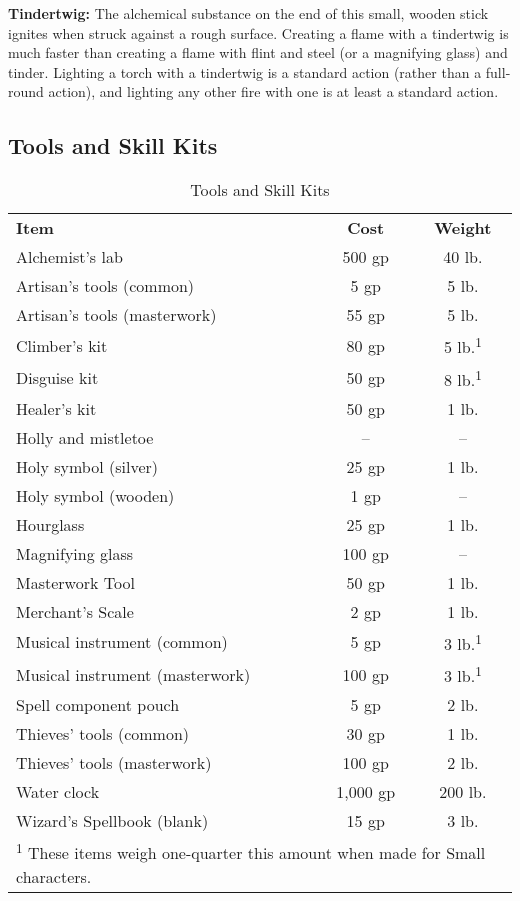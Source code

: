 \textbf{Tindertwig:} The alchemical substance on the end of this small, wooden 
stick ignites when struck against a rough surface. Creating a flame with a tindertwig 
is much faster than creating a flame with flint and steel (or a magnifying glass) 
and tinder. Lighting a torch with a tindertwig is a standard action (rather than 
a full-round action), and lighting any other fire with one is at least a standard 
action.

\subsection{Tools and Skill Kits}

\begin{table}[htb]
\caption{Tools and Skill Kits}
\centering
\begin{tabular}{l c c}
\textbf{Item} & \textbf{Cost} & \textbf{Weight}\\
Alchemist's lab & 500 gp & 40 lb.\\
Artisan's tools (common) & 5 gp & 5 lb.\\
Artisan's tools (masterwork) & 55 gp & 5 lb.\\
Climber's kit & 80 gp & 5 lb.\textsuperscript{1}\\
Disguise kit & 50 gp & 8 lb.\textsuperscript{1}\\
Healer's kit & 50 gp & 1 lb.\\
Holly and mistletoe & -- & --\\
Holy symbol (silver) & 25 gp & 1 lb.\\
Holy symbol (wooden) & 1 gp & --\\
Hourglass & 25 gp & 1 lb.\\
Magnifying glass & 100 gp & --\\
Masterwork  Tool & 50 gp & 1 lb.\\
Merchant's Scale & 2 gp & 1 lb.\\
Musical instrument (common) & 5 gp & 3 lb.\textsuperscript{1}\\
Musical instrument (masterwork) & 100 gp & 3 lb.\textsuperscript{1}\\
Spell component pouch & 5 gp & 2 lb.\\
Thieves' tools (common) & 30 gp & 1 lb.\\
Thieves' tools (masterwork) & 100 gp & 2 lb.\\
Water clock & 1,000 gp & 200 lb.\\
Wizard's Spellbook (blank) & 15 gp & 3 lb.\\
\multicolumn{3}{l}{\textsuperscript{1} These items weigh one-quarter this amount when made for Small characters.}\\
\end{tabular}
\end{table}


